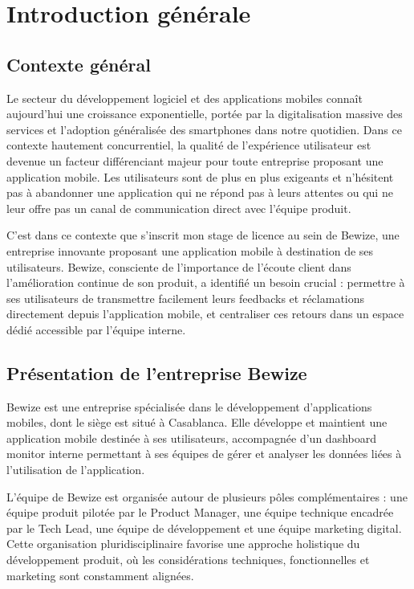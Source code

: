 \chapter{Introduction générale}

\section{Contexte général}
Le secteur du développement logiciel et des applications mobiles connaît 
aujourd'hui une croissance exponentielle, portée par la digitalisation 
massive des services et l'adoption généralisée des smartphones dans notre 
quotidien. Dans ce contexte hautement concurrentiel, la qualité de 
l'expérience utilisateur est devenue un facteur différenciant majeur 
pour toute entreprise proposant une application mobile. Les utilisateurs 
sont de plus en plus exigeants et n'hésitent pas à abandonner une 
application qui ne répond pas à leurs attentes ou qui ne leur offre 
pas un canal de communication direct avec l'équipe produit.

C'est dans ce contexte que s'inscrit mon stage de licence au sein de 
Bewize, une entreprise innovante proposant une application mobile à 
destination de ses utilisateurs. Bewize, consciente de l'importance 
de l'écoute client dans l'amélioration continue de son produit, a 
identifié un besoin crucial : permettre à ses utilisateurs de transmettre 
facilement leurs feedbacks et réclamations directement depuis l'application 
mobile, et centraliser ces retours dans un espace dédié accessible 
par l'équipe interne.

\section{Présentation de l'entreprise Bewize}
Bewize est une entreprise spécialisée dans le développement d'applications 
mobiles, dont le siège est situé à Casablanca. Elle développe et maintient 
une application mobile destinée à ses utilisateurs, accompagnée d'un 
dashboard monitor interne permettant à ses équipes de gérer et analyser 
les données liées à l'utilisation de l'application.

L'équipe de Bewize est organisée autour de plusieurs pôles complémentaires : 
une équipe produit pilotée par le Product Manager, une équipe technique 
encadrée par le Tech Lead, une équipe de développement et une équipe 
marketing digital. Cette organisation pluridisciplinaire favorise une 
approche holistique du développement produit, où les considérations 
techniques, fonctionnelles et marketing sont constamment alignées.

